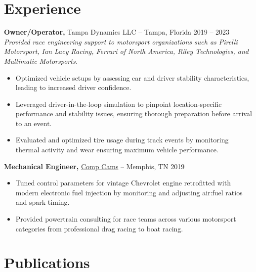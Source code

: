 \documentclass[12pt,letterpaper]{article} %
\begin{document}
\section*{Experience}
\textbf{Owner/Operator,} Tampa Dynamics LLC -- Tampa, Florida \hfill 2019 -- 2023 \\
\vspace{3pt}
\textit{Provided race engineering support to motorsport organizations such as Pirelli Motorsport, Ian Lacy Racing, Ferrari of North America, Riley Technologies, and Multimatic Motorsports.}
\vspace{-5pt}
\begin{itemize}
  \item Optimized vehicle setups by assessing car and driver stability characteristics, leading to increased driver confidence.
  \item Leveraged driver-in-the-loop simulation to pinpoint location-specific performance and stability issues, ensuring thorough preparation before arrival to an event.
  \item Evaluated and optimized tire usage during track events by monitoring thermal activity and wear ensuring maximum vehicle performance.
\end{itemize}

\textbf{Mechanical Engineer,} \href{https://www.compcams.com/}{Comp Cams} -- Memphis, TN \hfill 2019 \\
\vspace{-9pt}
\begin{itemize}
  \item Tuned control parameters for vintage Chevrolet engine retrofitted with modern electronic fuel injection by monitoring and adjusting air:fuel ratios and spark timing.
  \item Provided powertrain consulting for race teams across various motorsport categories from professional drag racing to boat racing.
\end{itemize}

\vspace{-18.5pt} %


\section*{Publications}
\end{document}
